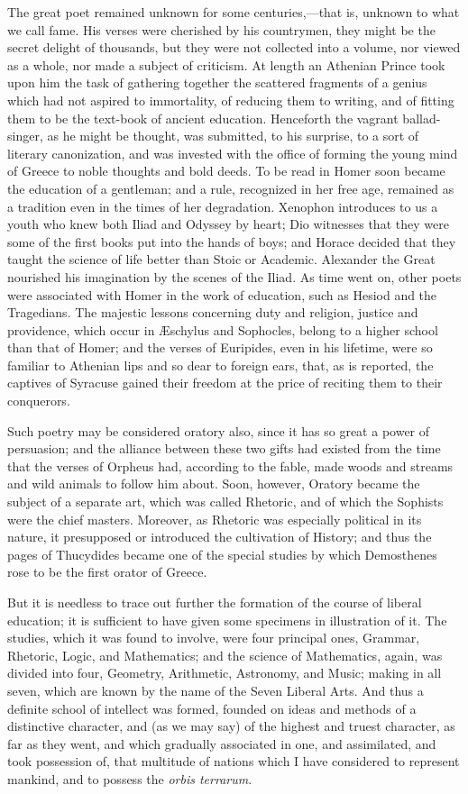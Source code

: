 The great poet remained unknown for some centuries,—that is,
unknown to what we call fame. His verses were cherished by his
countrymen, they might be the secret delight of thousands, but they
were not collected into a volume, nor viewed as a whole, nor made a
subject of criticism. At length an Athenian Prince took upon him the
task of gathering together the scattered fragments of a genius which
had not aspired to immortality, of reducing them to writing, and of
fitting them to be the text-book of ancient education. Henceforth the
vagrant ballad-singer, as he might be thought, was submitted, to his
surprise, to a sort of literary canonization, and was invested with
the office of forming the young mind of Greece to noble thoughts and
bold deeds. To be read in Homer soon became the education of a
gentleman; and a rule, recognized in her free age, remained as a
tradition even in the times of her degradation. Xenophon introduces to
us a youth who knew both Iliad and Odyssey by heart; Dio witnesses
that they were some of the first books put into the hands of boys; and
Horace decided that they taught the science of life better than Stoic
or Academic. Alexander the Great nourished his imagination by the
scenes of the Iliad. As time went on, other poets were associated with
Homer in the work of education, such as Hesiod and the Tragedians. The
majestic lessons concerning duty and religion, justice and providence,
which occur in Æschylus and Sophocles, belong to a higher school than
that of Homer; and the verses of Euripides, even in his lifetime, were
so familiar to Athenian lips and so dear to foreign ears, that, as is
reported, the captives of Syracuse gained their freedom at the
price of reciting them to their conquerors.

Such poetry may be considered oratory also, since it has so great a
power of persuasion; and the alliance between these two gifts had
existed from the time that the verses of Orpheus had, according to the
fable, made woods and streams and wild animals to follow him about.
Soon, however, Oratory became the subject of a separate art, which was
called Rhetoric, and of which the Sophists were the chief masters.
Moreover, as Rhetoric was especially political in its nature, it
presupposed or introduced the cultivation of History; and thus the
pages of Thucydides became one of the special studies by which
Demosthenes rose to be the first orator of Greece.

But it is needless to trace out further the formation of the course
of liberal education; it is sufficient to have given some specimens in
illustration of it. The studies, which it was found to involve, were
four principal ones, Grammar, Rhetoric, Logic, and Mathematics; and
the science of Mathematics, again, was divided into four, Geometry,
Arithmetic, Astronomy, and Music; making in all seven, which are known
by the name of the Seven Liberal Arts. And thus a definite school of
intellect was formed, founded on ideas and methods of a distinctive
character, and (as we may say) of the highest and truest character, as
far as they went, and which gradually associated in one, and
assimilated, and took possession of, that multitude of nations which I
have considered to represent mankind, and to possess the \emph{orbis
terrarum}.


